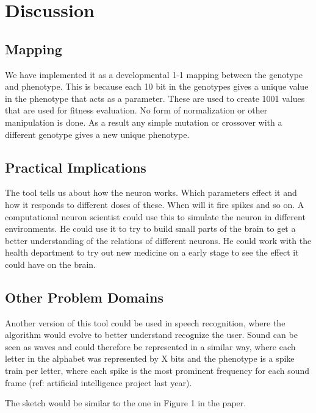 \documentclass[12pt, a4paper, oneside, titlepage]{article}
\begin{document}
\section{Discussion}

\subsection{Mapping}
We have implemented it as a developmental 1-1 mapping between the genotype and phenotype. This is because each 10 bit in the genotypes gives a unique value in the phenotype that acts as a parameter. These are used to create 1001 values that are used for fitness evaluation. No form of normalization or other manipulation is done. As a result any simple mutation or crossover with a different genotype gives a new unique phenotype. 


\subsection{Practical Implications}
The tool tells us about how the neuron works. Which parameters effect it and how it responds to different doses of these. When will it fire spikes and so on. 
A computational neuron scientist could use this to simulate the neuron in different environments. He could use it to try to build small parts of the brain to get a better understanding of the relations of different neurons. 
He could work with the health department to try out new medicine on a early stage to see the effect it could have on the brain.  

\subsection{Other Problem Domains}
Another version of this tool could be used in speech recognition, where the algorithm would evolve to better understand recognize the user. Sound can be seen as waves and could therefore be represented in a similar way, where each letter in the alphabet was represented by X bits and the phenotype is a spike train per letter, where each spike is the most prominent frequency for each sound frame (ref: artificial intelligence project last year). 

The sketch would be similar to the one in Figure 1 in the paper.
\end{document}
